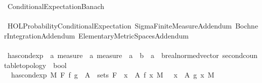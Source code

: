 %
\begin{isabellebody}%
%
%
\isadelimtheory
%
\endisadelimtheory
%
\isatagtheory
{}\isamarkupfalse%
\ Conditional{\isacharunderscore}{\kern0pt}Expectation{\isacharunderscore}{\kern0pt}Banach\ \ \ \ \ \ \ \ \ \ \ \ \ \ \ \ \ \ \ \ \ \ \ \ \ \ \ \ \ \ \ \ \ \ \ \ \ \ \ \ \ \ \ \ \ \ \ \ \ \ \ \ \ \ \ \ \ \ \ \ \ \ \ \ \ \ \ \ \ \ \ \ \ \ \ \ \isanewline
{}\ {\isachardoublequoteopen}HOL{\isacharminus}{\kern0pt}Probability{\isachardot}{\kern0pt}Conditional{\isacharunderscore}{\kern0pt}Expectation{\isachardoublequoteclose}\ Sigma{\isacharunderscore}{\kern0pt}Finite{\isacharunderscore}{\kern0pt}Measure{\isacharunderscore}{\kern0pt}Addendum\ Bochner{\isacharunderscore}{\kern0pt}Integration{\isacharunderscore}{\kern0pt}Addendum\ Elementary{\isacharunderscore}{\kern0pt}Metric{\isacharunderscore}{\kern0pt}Spaces{\isacharunderscore}{\kern0pt}Addendum\isanewline
{}%
\endisatagtheory
{\isafoldtheory}%
%
\isadelimtheory
\ \ \ \ \ \ \ \ \ \ \ \ \ \ \ \ \ \ \ \ \ \ \ \ \ \ \ \ \ \ \ \ \ \ \ \ \ \ \ \ \ \ \ \isanewline
%
\endisadelimtheory
\isanewline
{}\isamarkupfalse%
\ has{\isacharunderscore}{\kern0pt}cond{\isacharunderscore}{\kern0pt}exp\ {\isacharcolon}{\kern0pt}{\isacharcolon}{\kern0pt}\ {\isachardoublequoteopen}{\isacharprime}{\kern0pt}a\ measure\ {\isasymRightarrow}\ {\isacharprime}{\kern0pt}a\ measure\ {\isasymRightarrow}\ {\isacharparenleft}{\kern0pt}{\isacharprime}{\kern0pt}a\ {\isasymRightarrow}\ {\isacharprime}{\kern0pt}b{\isacharparenright}{\kern0pt}\ {\isasymRightarrow}\ {\isacharparenleft}{\kern0pt}{\isacharprime}{\kern0pt}a\ {\isasymRightarrow}\ {\isacharprime}{\kern0pt}b{\isacharcolon}{\kern0pt}{\isacharcolon}{\kern0pt}{\isacharbraceleft}{\kern0pt}real{\isacharunderscore}{\kern0pt}normed{\isacharunderscore}{\kern0pt}vector{\isacharcomma}{\kern0pt}\ second{\isacharunderscore}{\kern0pt}countable{\isacharunderscore}{\kern0pt}topology{\isacharbraceright}{\kern0pt}{\isacharparenright}{\kern0pt}\ {\isasymRightarrow}\ bool{\isachardoublequoteclose}\ \ \isanewline
\ \ {\isachardoublequoteopen}has{\isacharunderscore}{\kern0pt}cond{\isacharunderscore}{\kern0pt}exp\ M\ F\ f\ g\ {\isacharequal}{\kern0pt}\ {\isacharparenleft}{\kern0pt}{\isacharparenleft}{\kern0pt}{\isasymforall}A\ {\isasymin}\ sets\ F{\isachardot}{\kern0pt}\ {\isacharparenleft}{\kern0pt}{\isasymintegral}\ x\ {\isasymin}\ A{\isachardot}{\kern0pt}\ f\ x\ {\isasympartial}M{\isacharparenright}{\kern0pt}\ {\isacharequal}{\kern0pt}\ {\isacharparenleft}{\kern0pt}{\isasymintegral}\ x\ {\isasymin}\ A{\isachardot}{\kern0pt}\ g\ x\ {\isasympartial}M{\isacharparenright}{\kern0pt}{\isacharparenright}{\kern0pt}\isanewline

\end{isabellebody}
